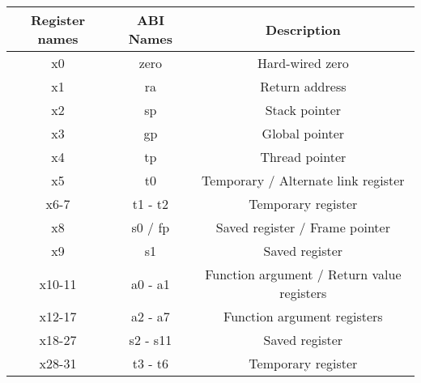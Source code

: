 \begin{table}[H]
  \centering
  \begin{tabular}{c|c|c}
      \toprule
      Register names & ABI Names & Description \\
    \midrule
      x0 & zero & Hard-wired zero  \\
      x1 & ra & Return address  \\
      x2 & sp & Stack pointer  \\
      x3 & gp & Global pointer  \\
      x4 & tp & Thread pointer  \\
      x5 & t0 & Temporary / Alternate link register  \\
      x6-7 & t1 - t2 & Temporary register  \\
      x8 & s0 / fp & Saved register / Frame pointer  \\
      x9 & s1 & Saved register  \\
      x10-11 & a0 - a1 & Function argument / Return value registers  \\
      x12-17 & a2 - a7 & Function argument registers  \\
      x18-27 & s2 - s11 & Saved register  \\
      x28-31 & t3 - t6 & Temporary register  \\
      \bottomrule
  \end{tabular}
\end{table}